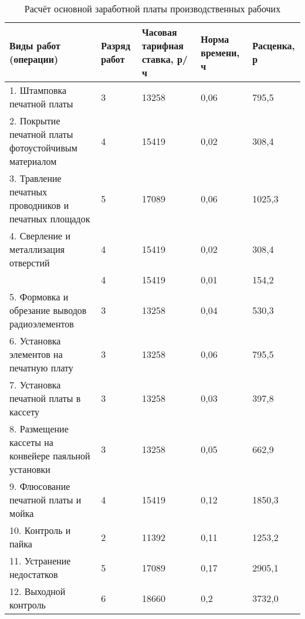 \begin{table}[h!]
  \caption{Расчёт основной заработной платы производственных рабочих}
  \label{tbl:technological_process_result}
  \centering
  \small{
    \begin{tabular}{| p{} | p{} | p{} |
                      p{} | p{} |}
      \hline
      Виды работ (операции) &
      Разряд работ &
      Часовая \newline тарифная \newline ставка, р/ч &
      Норма \newline времени, ч &
      Расценка, р \\ \hline

      1. Штамповка печатной платы                                    & 3 & 13258 & 0,06 & 795,5   \\ \hline
      2. Покрытие печатной платы \newline фотоустойчивым материалом  & 4 & 15419 & 0,02 & 308,4   \\ \hline
      3. Травление печатных проводников и печатных площадок          & 5 & 17089 & 0,06 & 1025,3  \\ \hline
      4. Сверление и металлизация \newline отверстий                 & 4 & 15419 & 0,02 & 308,4   \\ \cline{2-5}
                                                                     & 4 & 15419 & 0,01 & 154,2   \\ \hline
      5. Формовка и обрезание \newline выводов радиоэлементов        & 3 & 13258 & 0,04 & 530,3   \\ \hline
      6. Установка элементов \newline на печатную плату              & 3 & 13258 & 0,06 & 795,5   \\ \hline
      7. Установка печатной платы \newline в кассету                 & 3 & 13258 & 0,03 & 397,8   \\ \hline
      8. Размещение кассеты на \newline конвейере паяльной установки & 3 & 13258 & 0,05 & 662,9   \\ \hline
      9. Флюсование печатной платы и мойка                           & 4 & 15419 & 0,12 & 1850,3  \\ \hline
      10. Контроль и пайка                                           & 2 & 11392 & 0,11 & 1253,2  \\ \hline
      11. Устранение недостатков                                     & 5 & 17089 & 0,17 & 2905,1  \\ \hline
      12. Выходной контроль                                          & 6 & 18660 & 0,2  & 3732,0  \\ \hline


\end{tabular}}
\end{table}
